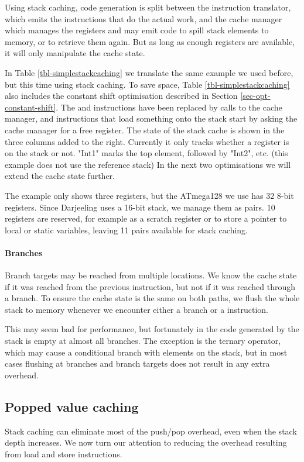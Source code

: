 Using stack caching, code generation is split between the instruction translator, which emits the instructions that do the actual work, and the cache manager which manages the registers and may emit code to spill stack elements to memory, or to retrieve them again. But as long as enough registers are available, it will only manipulate the cache state.

In Table \ref{tbl-simplestackcaching} we translate the same example we used before, but this time using stack caching. To save space, Table \ref{tbl-simplestackcaching} also includes the constant shift optimisation described in Section \ref{sec-opt-constant-shift}. The  and  instructions have been replaced by calls to the cache manager, and instructions that load something onto the stack start by asking the cache manager for a free register. The state of the stack cache is shown in the three columns added to the right. Currently it only tracks whether a register is on the stack or not. "Int1" marks the top element, followed by "Int2", etc. (this example does not use the reference stack) In the next two optimisations we will extend the cache state further.
 
The example only shows three registers, but the ATmega128 we use has 32 8-bit registers. Since Darjeeling uses a 16-bit stack, we manage them as pairs. 10 registers are reserved, for example as a scratch register or to store a pointer to local or static variables, leaving 11 pairs available for stack caching.

\paragraph{Branches} Branch targets may be reached from multiple locations. We know the cache state if it was reached from the previous instruction, but not if it was reached through a branch. To ensure the cache state is the same on both paths, we flush the whole stack to memory whenever we encounter either a branch or a  instruction. 

This may seem bad for performance, but fortunately in the code generated by  the stack is empty at almost all branches. The exception is the ternary  \mycode{:} operator, which may cause a conditional branch with elements on the stack, but in most cases flushing at branches and branch targets does not result in any extra overhead.

\subsection{Popped value caching}
\label{sec-optimisations-popped-value-caching}
Stack caching can eliminate most of the push/pop overhead, even when the stack depth increases. We now turn our attention to reducing the overhead resulting from load and store instructions.

